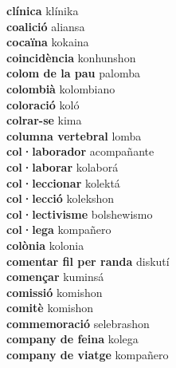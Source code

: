 \textbf{ clínica  } klínika \\
\textbf{ coalició  } aliansa \\
\textbf{ cocaïna  } kokaina \\
\textbf{ coincidència  } konhunshon \\
\textbf{ colom de la pau  } palomba \\
\textbf{ colombià  } kolombiano \\
\textbf{ coloració  } koló \\
\textbf{ colrar-se  } kima \\
\textbf{ columna vertebral  } lomba \\
\textbf{ col·laborador  } acompañante \\
\textbf{ col·laborar  } kolaborá \\
\textbf{ col·leccionar  } kolektá \\
\textbf{ col·lecció  } kolekshon \\
\textbf{ col·lectivisme  } bolshewismo \\
\textbf{ col·lega  } kompañero \\
\textbf{ colònia  } kolonia \\
\textbf{ comentar fil per randa  } diskutí \\
\textbf{ començar  } kuminsá \\
\textbf{ comissió  } komishon \\
\textbf{ comitè  } komishon \\
\textbf{ commemoració  } selebrashon \\
\textbf{ company de feina  } kolega \\
\textbf{ company de viatge  } kompañero \\
